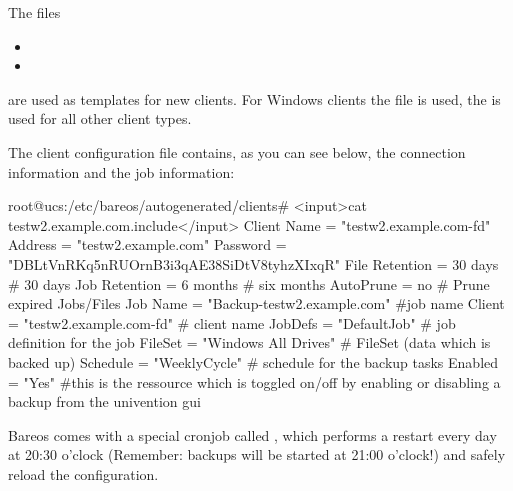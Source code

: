 The files
\begin{itemize}
    \item {}
    \item {}
\end{itemize}
are used as templates for new clients. For Windows clients the file  is used, the  is used for all other client types.

 The client configuration file contains, as you can see below, the connection information and the job information:

\begin{commands}{}
root@ucs:/etc/bareos/autogenerated/clients# <input>cat testw2.example.com.include</input>
Client {
 Name = "testw2.example.com-fd"
 Address = "testw2.example.com"
 Password = "DBLtVnRKq5nRUOrnB3i3qAE38SiDtV8tyhzXIxqR"
 File Retention = 30 days # 30 days
 Job Retention = 6 months # six months
 AutoPrune = no # Prune expired Jobs/Files
}
Job {
 Name = "Backup-testw2.example.com" #job name
 Client = "testw2.example.com-fd" # client name
 JobDefs = "DefaultJob" # job definition for the job
 FileSet = "Windows All Drives" # FileSet (data which is backed up)
 Schedule = "WeeklyCycle" # schedule for the backup tasks
 Enabled = "Yes" #this is the ressource which is toggled on/off by enabling or disabling a backup from the univention gui
 }
\end{commands}

Bareos comes with a special cronjob called , which performs a restart every day at 20:30 o'clock (Remember: backups will be started at 21:00 o'clock!) and safely reload the configuration.
